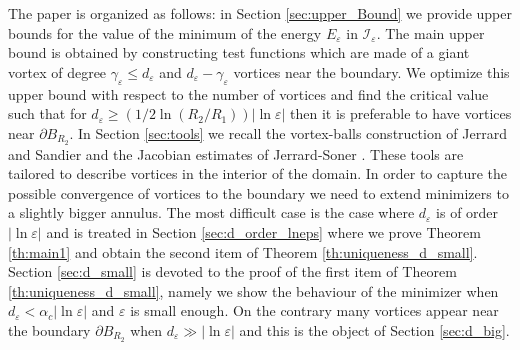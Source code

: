 \documentclass[12pt,reqno]{amsart}
\def\I{{\mathcal I}}
\def\e {{\varepsilon}}
\def \p {\partial}
\numberwithin{equation}{section}
\begin{document}
The paper is organized as follows: in Section \ref{sec:upper_Bound} we provide upper bounds for the value of the minimum of the energy \(E_\e\) in \(\I_\e\). The main upper bound is obtained by constructing test functions which are made of a giant vortex of degree \(\gamma_\e\leq d_\e\) and \(d_\e-\gamma_\e\) vortices near the boundary. We  optimize this upper bound with respect to the number of vortices and find the critical value such that for \(d_\e \geq \left(1/2\ln (R_2/R_1)\right) |\ln \e|\) then it is preferable to have vortices near \(\p B_{R_2}\). In Section \ref{sec:tools} we recall the vortex-balls construction of Jerrard \cite{Jerrard_1999} and Sandier \cite{Sandier_1998} and the Jacobian estimates of Jerrard-Soner \cite{Jerrard_Soner_2002_Calvar}. These tools are tailored to describe vortices in the interior of the domain. In order to capture the possible convergence of vortices to the boundary we need to extend minimizers to a slightly bigger annulus. The most difficult case is the case where \(d_\e\) is of order \(|\ln \e|\) and is treated in Section \ref{sec:d_order_lneps} where we prove Theorem \ref{th:main1} and obtain the second item of Theorem \ref{th:uniqueness_d_small}. Section \ref{sec:d_small} is devoted to the proof of the first item of Theorem \ref{th:uniqueness_d_small}, namely we show the behaviour of  the minimizer when \(d_\e< \alpha_c|\ln \e|\) and \(\e\) is small enough.  On the contrary many vortices appear near the boundary \(\p B_{R_2}\) when \(d_\e \gg |\ln \e|\) and this is the object of  Section \ref{sec:d_big}.
\end{document}
